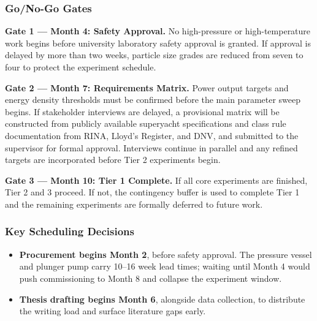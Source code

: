 \documentclass[12pt]{article}
\begin{document}
\subsubsection*{Go/No-Go Gates}

\noindent\textbf{Gate 1 --- Month 4: Safety Approval.} No high-pressure or high-temperature work
begins before university laboratory safety approval is granted. If approval is
delayed by more than two weeks, particle size grades are reduced from seven to four
to protect the experiment schedule.

\medskip
\noindent\textbf{Gate 2 --- Month 7: Requirements Matrix.} Power output targets and energy density
thresholds must be confirmed before the main parameter sweep begins. If stakeholder
interviews are delayed, a provisional matrix will be constructed from publicly
available superyacht specifications and class rule documentation from RINA, Lloyd's
Register, and DNV, and submitted to the supervisor for formal approval. Interviews
continue in parallel and any refined targets are incorporated before Tier 2
experiments begin.

\medskip
\noindent\textbf{Gate 3 --- Month 10: Tier 1 Complete.} If all core experiments are finished, Tier
2 and 3 proceed. If not, the contingency buffer is used to complete Tier 1 and the
remaining experiments are formally deferred to future work.

\subsubsection*{Key Scheduling Decisions}

\begin{itemize}
    \item \textbf{Procurement begins Month 2}, before safety approval. The pressure vessel and
          plunger pump carry 10--16 week lead times; waiting until Month 4 would push
          commissioning to Month 8 and collapse the experiment window.
    \item \textbf{Thesis drafting begins Month 6}, alongside data collection, to distribute the
          writing load and surface literature gaps early.
\end{itemize}
\end{document}
